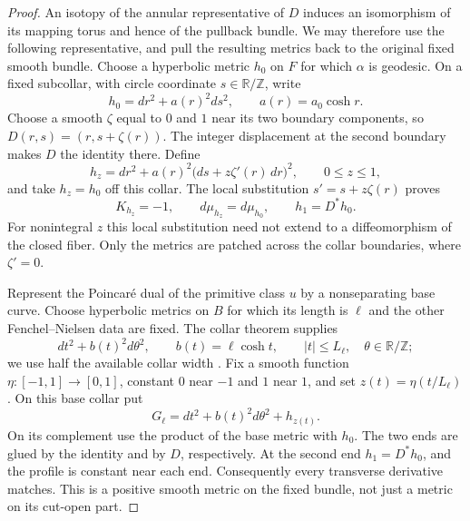 \begin{proof}
An isotopy of the annular representative of $D$ induces an isomorphism
of its mapping torus and hence of the pullback bundle.  We may therefore
use the following representative, and pull the resulting metrics back
to the original fixed smooth bundle.
Choose a hyperbolic metric $h_0$ on $F$ for which $\alpha$ is geodesic.
On a fixed subcollar, with circle coordinate $s\in\mathbb R/\mathbb Z$,
write
\[
 h_0=dr^2+a(r)^2ds^2,\qquad a(r)=a_0\cosh r.
\]
Choose a smooth $\zeta$ equal to $0$ and $1$ near its two boundary
components, so $D(r,s)=(r,s+\zeta(r))$.  The integer displacement
at the second boundary makes $D$ the identity there.  Define
\begin{equation}\label{eq:fixed-bundle-fiber-path}
 h_z=dr^2+a(r)^2\bigl(ds+z\zeta'(r)\,dr\bigr)^2,
 \qquad 0\le z\le1,
\end{equation}
and take $h_z=h_0$ off this collar.  The local substitution
$s'=s+z\zeta(r)$ proves
\[
 K_{h_z}=-1,\qquad d\mu_{h_z}=d\mu_{h_0},
 \qquad h_1=D^*h_0.
\]
For nonintegral $z$ this local substitution need not extend to a
diffeomorphism of the closed fiber.  Only the metrics are patched
across the collar boundaries, where $\zeta'=0$.

Represent the Poincar\'e dual of the primitive class $u$ by a
nonseparating base curve.  Choose hyperbolic metrics on $B$ for which
its length is $\ell$ and the other Fenchel--Nielsen data are fixed.
The collar theorem supplies
\begin{equation}\label{eq:fixed-bundle-base-collar}
 dt^2+b(t)^2d\theta^2,\qquad b(t)=\ell\cosh t,\qquad
 |t|\le L_\ell,\quad\theta\in\mathbb R/\mathbb Z;
\end{equation}
we use half the available collar width
\cite[Appendix A]{RupflinToppingCollars}.  Fix a smooth function
$\eta:[-1,1]\to[0,1]$, constant $0$ near $-1$ and $1$ near $1$,
and set $z(t)=\eta(t/L_\ell)$.  On this base collar put
\begin{equation}\label{eq:fixed-bundle-metric}
 G_\ell=dt^2+b(t)^2d\theta^2+h_{z(t)}.
\end{equation}
On its complement use the product of the base metric with $h_0$.
The two ends are glued by the identity and by $D$, respectively.
At the second end $h_1=D^*h_0$, and the profile is constant near
each end.  Consequently every transverse derivative matches.  This
is a positive smooth metric on the fixed bundle, not just a metric
on its cut-open part.


\end{proof}
